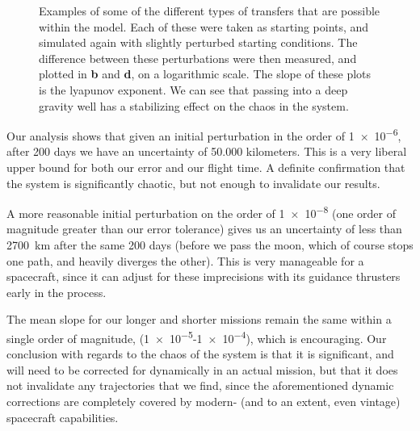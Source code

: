 \begin{figure}
{        \label{fig:long_leto_slope}
    }
    \caption{Examples of some of the different types of transfers that are possible within the model. Each of these were taken as starting points, and simulated again with slightly perturbed starting conditions. The difference between these perturbations were then measured, and plotted in \textbf{b} and \textbf{d}, on a logarithmic scale. The slope of these plots is the lyapunov exponent. We can see that passing into a deep gravity well has a stabilizing effect on the chaos in the system.}
    \label{fig:lyapunov}
\end{figure} 

Our analysis shows that given an initial perturbation in the order of \num{1e-6}, after 200 days we have an uncertainty of 50.000 kilometers. This is a very liberal upper bound for both our error and our flight time. A definite confirmation that the system is significantly chaotic, but not enough to invalidate our results. 

A more reasonable initial perturbation on the order of \num{1e-8} (one order of magnitude greater than our error tolerance) gives us an uncertainty of less than \SI{2700}{km} after the same 200 days (before we pass the moon, which of course stops one path, and heavily diverges the other). This is very manageable for a spacecraft, since it can adjust for these imprecisions with its guidance thrusters early in the process.

The mean slope for our longer and shorter missions remain the same within a single order of magnitude, (\num{1e-5}-\num{1e-4}), which is encouraging. Our conclusion with regards to the chaos of the system is that it is significant, and will need to be corrected for dynamically in an actual mission, but that it does not invalidate any trajectories that we find, since the aforementioned dynamic corrections are completely covered by modern- (and to an extent, even vintage) spacecraft capabilities.



